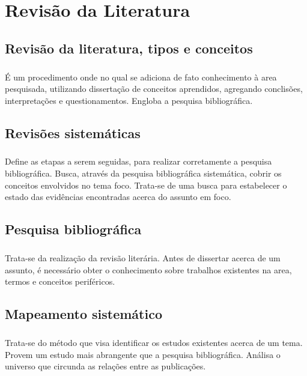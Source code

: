 \chapter{Revisão da Literatura}

\section{Revisão da literatura, tipos e conceitos}

\paragraph{}
É um procedimento onde no qual se adiciona de fato conhecimento à area pesquisada, utilizando dissertação de conceitos aprendidos, agregando conclisões, interpretações e questionamentos. Engloba a pesquisa bibliográfica.

\section{Revisões sistemáticas}

\paragraph{}
Define as etapas a serem seguidas, para realizar corretamente a pesquisa bibliográfica. Busca, através da pesquisa bibliográfica sistemática, cobrir os conceitos envolvidos no tema foco. Trata-se de uma busca para estabelecer o estado das evidências encontradas acerca do assunto em foco.

\section{Pesquisa bibliográfica}

\paragraph{}
Trata-se da realização da revisão literária. Antes de dissertar acerca de um assunto, é necessário obter o conhecimento sobre trabalhos existentes na area, termos e conceitos periféricos.

\section{Mapeamento sistemático}

\paragraph{}
Trata-se do método que visa identificar os estudos existentes acerca de um tema. Provem um estudo mais abrangente que a pesquisa bibliográfica.  Análisa o universo que circunda as relações entre as  publicações.

